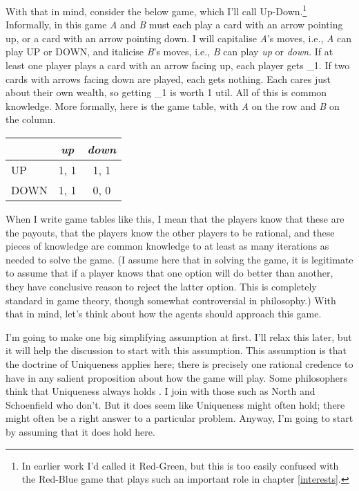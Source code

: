 \documentclass[
  11pt,
]{book}
\begin{document}
With that in mind, consider the below game, which I'll call Up-Down.\footnote{In earlier work I'd called it Red-Green, but this is too easily confused with the Red-Blue game that plays such an important role in chapter \ref{interests}.} Informally, in this game \emph{A} and \emph{B} must each play a card with an arrow pointing up, or a card with an arrow pointing down. I will capitalise \emph{A}'s moves, i.e., \emph{A} can play UP or DOWN, and italicise \emph{B}'s moves, i.e., \emph{B} can play \emph{up} or \emph{down}. If at least one player plays a card with an arrow facing up, each player gets \_1. If two cards with arrows facing down are played, each gets nothing. Each cares just about their own wealth, so getting \_1 is worth 1 util. All of this is common knowledge. More formally, here is the game table, with \emph{A} on the row and \emph{B} on the column.

\begin{longtable}[]{@{}lcc@{}}
\toprule\noalign{}
& \emph{up} & \emph{down} \\
\midrule\noalign{}
\endhead
\bottomrule\noalign{}
\endlastfoot
UP & 1, 1 & 1, 1 \\
DOWN & 1, 1 & 0, 0 \\
\end{longtable}

When I write game tables like this, I mean that the players know that these are the payouts, that the players know the other players to be rational, and these pieces of knowledge are common knowledge to at least as many iterations as needed to solve the game. (I assume here that in solving the game, it is legitimate to assume that if a player knows that one option will do better than another, they have conclusive reason to reject the latter option. This is completely standard in game theory, though somewhat controversial in philosophy.) With that in mind, let's think about how the agents should approach this game.

I'm going to make one big simplifying assumption at first. I'll relax this later, but it will help the discussion to start with this assumption. This assumption is that the doctrine of Uniqueness applies here; there is precisely one rational credence to have in any salient proposition about how the game will play. Some philosophers think that Uniqueness always holds \citep{White2005-WHIEP}. I join with those such as North \citeyearpar{North2010} and Schoenfield \citeyearpar{Schoenfield2013} who don't. But it does seem like Uniqueness might often hold; there might often be a right answer to a particular problem. Anyway, I'm going to start by assuming that it does hold here.
\end{document}
